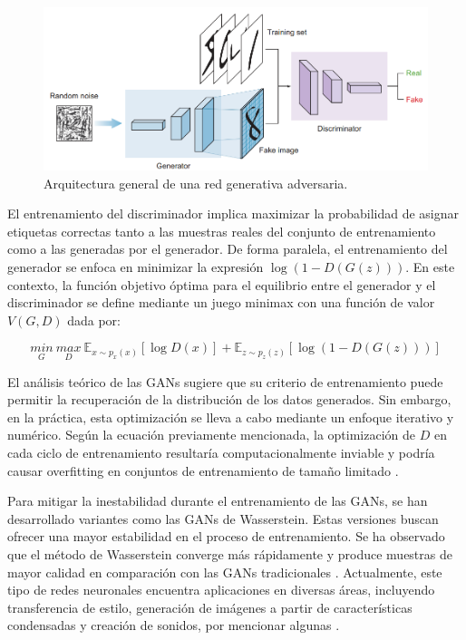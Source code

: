 \begin{figure}[H]
    \begin{center}
        \includegraphics[width=1\textwidth]{Images/gans.png}
    \end{center}
    \caption{Arquitectura general de una red generativa adversaria.}
    \label{fig:GANs}
\end{figure}

El entrenamiento del discriminador implica maximizar la probabilidad de asignar etiquetas correctas tanto a las muestras reales del conjunto de entrenamiento como a las generadas por el generador. De forma paralela, el entrenamiento del generador se enfoca en minimizar la expresión \(\log(1 - D(G(z)))\). En este contexto, la función objetivo óptima para el equilibrio entre el generador y el discriminador se define mediante un juego minimax con una función de valor \(V(G, D)\) dada por:

\begin{equation}
    \underset{G}{min}\:\underset{D}{max}\: \mathbb{E}_{x \sim p_{x}(x)}[\log D(x)] + \mathbb{E}_{z \sim p_{z}(z)} [\log (1-D(G(z)))]
\end{equation}

El análisis teórico de las GANs sugiere que su criterio de entrenamiento puede permitir la recuperación de la distribución de los datos generados. Sin embargo, en la práctica, esta optimización se lleva a cabo mediante un enfoque iterativo y numérico. Según la ecuación previamente mencionada, la optimización de \(D\) en cada ciclo de entrenamiento resultaría computacionalmente inviable y podría causar overfitting en conjuntos de entrenamiento de tamaño limitado \cite{jiang2018deep}.

Para mitigar la inestabilidad durante el entrenamiento de las GANs, se han desarrollado variantes como las GANs de Wasserstein. Estas versiones buscan ofrecer una mayor estabilidad en el proceso de entrenamiento. Se ha observado que el método de Wasserstein converge más rápidamente y produce muestras de mayor calidad en comparación con las GANs tradicionales \cite{arjovsky2017wasserstein}. Actualmente, este tipo de redes neuronales encuentra aplicaciones en diversas áreas, incluyendo transferencia de estilo, generación de imágenes a partir de características condensadas y creación de sonidos, por mencionar algunas \cite{goodfellow2016deep}.
